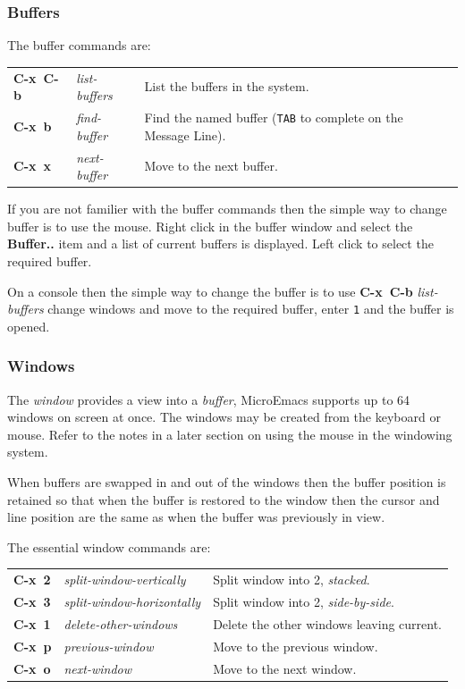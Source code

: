 \documentclass[11pt,a4paper,pdftex]{article}
\begin{document}
\subsubsection{Buffers}

  The buffer commands are:

  \begin{longtable}{ll@{\ --\ }l}
    \endhead
    \endfoot
    \endlastfoot
    \textbf{C-x~C-b} & \textit{list-buffers} &
    List the buffers in the system.\\
    \textbf{C-x~b} & \textit{find-buffer} &
    Find the named buffer (\texttt{TAB} to complete on the Message Line).\\
    \textbf{C-x~x} & \textit{next-buffer} &
    Move to the next buffer.\\
  \end{longtable}

  If you are not familier with the buffer commands then the simple way to
  change buffer is to use the mouse. Right click in the buffer window and
  select the \textbf{Buffer..} item and a list of current buffers is
  displayed. Left click to select the required buffer.

  On a console then the simple way to change the buffer is to use
  \textbf{C-x~C-b} \textit{list-buffers} change windows and move to the
  required buffer, enter \texttt{1} and the buffer is opened.

\subsubsection{Windows}

  The \textit{window} provides a view into a \textit{buffer}, MicroEmacs
  supports up to 64 windows on screen at once. The windows may be created from
  the keyboard or mouse. Refer to the notes in a later section on using the
  mouse in the windowing system.

  When buffers are swapped in and out of the windows then the buffer position
  is retained so that when the buffer is restored to the window then the
  cursor and line position are the same as when the buffer was previously in
  view.

  The essential window commands are:

  \begin{longtable}{ll@{\ --\ }l}
    \endhead
    \endfoot
    \endlastfoot
    \textbf{C-x~2} & \textit{split-window-vertically} &
    Split window into 2, \textit{stacked}.\\
    \textbf{C-x~3} & \textit{split-window-horizontally} &
    Split window into 2, \textit{side-by-side}.\\
    \textbf{C-x~1} & \textit{delete-other-windows} &
    Delete the other windows leaving current.\\
    \textbf{C-x~p} & \textit{previous-window} &
    Move to the previous window.\\
    \textbf{C-x~o} & \textit{next-window} &
    Move to the next window.\\
  \end{longtable}
\end{document}
